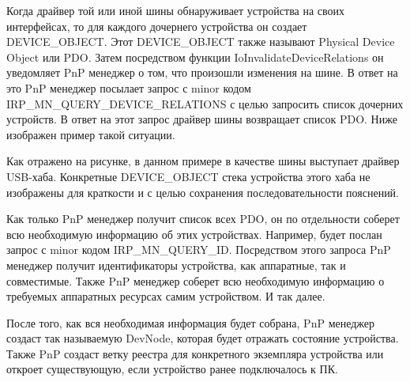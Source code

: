 \documentclass[14pt,a4paper]{article}
\begin{document}
\par Когда драйвер той или иной шины обнаруживает устройства на своих интерфейсах, то для каждого дочернего устройства он создает DEVICE\_OBJECT. Этот DEVICE\_OBJECT также называют Physical Device Object или PDO. Затем посредством функции IoInvalidateDeviceRelations он уведомляет PnP менеджер о том, что произошли изменения на шине. В ответ на это PnP менеджер посылает запрос с minor кодом IRP\_MN\_QUERY\_DEVICE\_RELATIONS с целью запросить список дочерних устройств. В ответ на этот запрос драйвер шины возвращает список PDO. Ниже изображен пример такой ситуации.\\

\begin{figure}[H]
  \centering
  \caption{}
\end{figure}

\par Как отражено на рисунке, в данном примере в качестве шины выступает драйвер USB-хаба. Конкретные DEVICE\_OBJECT стека устройства этого хаба не изображены для краткости и с целью сохранения последовательности пояснений.\\

\par Как только PnP менеджер получит список всех PDO, он по отдельности соберет всю необходимую информацию об этих устройствах. Например, будет послан запрос с minor кодом IRP\_MN\_QUERY\_ID. Посредством этого запроса PnP менеджер получит идентификаторы устройства, как аппаратные, так и совместимые. Также PnP менеджер соберет всю необходимую информацию о требуемых аппаратных ресурсах самим устройством. И так далее.\\

\par После того, как вся необходимая информация будет собрана, PnP менеджер создаст так называемую DevNode, которая будет отражать состояние устройства. Также PnP создаст ветку реестра для конкретного экземпляра устройства или откроет существующую, если устройство ранее подключалось к ПК.\\
\end{document}
